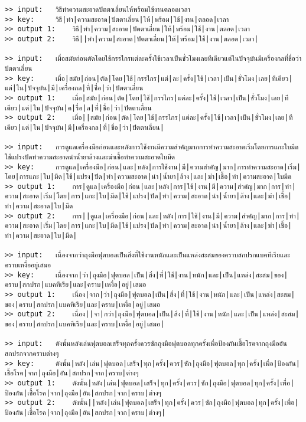 \documentclass[11pt]{article}
\begin{document}
\begin{Verbatim}[commandchars=\\\{\}]
>> input:	วิธีทำความสะอาดปัตตาเลี่ยนให้พร้อมใช้งานตลอดเวลา
>> key:		วิธี|ทำ|ความสะอาด|ปัตตาเลี่ยน|ให้|พร้อม|ใช้|งาน|ตลอด|เวลา
>> output 1:	วิธี|ทำ|ความ|สะอาด|ปัตตาเลี่ยน|ให้|พร้อม|ใช้|งาน|ตลอด|เวลา
>> output 2:	วิธี||ทำ|ความ|สะอาด|ปัตตาเลี่ยน|ให้|พร้อม|ใช้|งาน|ตลอด|เวลา|

>> input:	เมื่อสมัยก่อนตัดโดยใช้กรรไกรแต่ละครั้งใช้เวลาเป็นชั่วโมงเลยทีเดียวแต่ในปัจจุบันมีเครื่องกลที่ชื่อว่าปัตตาเลี่ยน
>> key:		เมื่อ|สมัย|ก่อน|ตัด|โดย|ใช้|กรรไกร|แต่|ละ|ครั้ง|ใช้|เวลา|เป็น|ชั่วโมง|เลย|ทีเดียว|แต่|ใน|ปัจจุบัน|มี|เครื่องกล|ที่|ชื่อ|ว่า|ปัตตาเลี่ยน
>> output 1:	เมื่อ|สมัย|ก่อน|ตัด|โดย|ใช้|กรรไกร|แต่ละ|ครั้ง|ใช้|เวลา|เป็น|ชั่วโมง|เลย|ทีเดียว|แต่|ใน|ปัจจุบัน|ค|รื่อ|ล|ที่|ชื่อ|ว่า|ปัตตาเลี่ยน
>> output 2:	เมื่อ||สมัย|ก่อน|ตัด|โดย|ใช้|กรรไกร|แต่ละ|ครั้ง|ใช้|เวลา|เป็น|ชั่วโมง|เลย|ทีเดียว|แต่|ใน|ปัจจุบัน|มี|เครื่องกล|ที่|ชื่อ|ว่า|ปัตตาเลี่ยน|

>> input:	การดูแลเครื่องมือก่อนและหลังการใช้งานมีความสำคัญมากการทำความสะอาดเริ่มโดยการแกะใบมีดใช้แปรงปัดทำความสะอาดนำน้ำยาล้างและฆ่าเชื้อทำความสะอาดใบมีด
>> key:		การดูแล|เครื่องมือ|ก่อน|และ|หลัง|การใช้งาน|มี|ความสำคัญ|มาก|การทำความสะอาด|เริ่ม|โดย|การแกะ|ใบ|มีด|ใช้|แปรง|ปัด|ทำ|ความสะอาด|นำ|น้ำยา|ล้าง|และ|ฆ่า|เชื้อ|ทำ|ความสะอาด|ใบมีด
>> output 1:	การ|ดูแล|เครื่องมือ|ก่อน|และ|หลัง|การ|ใช้|งาน|มี|ความ|สำคัญ|มาก|การ|ทำ|ความ|สะอาด|เริ่ม|โดย|การ|แกะ|ใบ|มีด|ใช้|แปรง|ปัด|ทำ|ความ|สะอาด|นำ|น้ำยา|ล้าง|และ|ฆ่า|เชื้อ|ทำ|ความ|สะอาด|ใบ|มีด
>> output 2:	การ||ดูแล|เครื่องมือ|ก่อน|และ|หลัง|การ|ใช้|งาน|มี|ความ|สำคัญ|มาก|การ|ทำ|ความ|สะอาด|เริ่ม|โดย|การ|แกะ|ใบ|มีด|ใช้|แปรง|ปัด|ทำ|ความ|สะอาด|นำ|น้ำยา|ล้าง|และ|ฆ่า|เชื้อ|ทำ|ความ|สะอาด|ใบ|มีด|

>> input:	เนื่องจากว่าถุงมือฟุตบอลเป็นสิ่งที่ใช้งานหนักและเป็นแหล่งสะสมของคราบสกปรกแบคทีเรียและคราบเหงื่ออยู่เสมอ
>> key:		เนื่องจาก|ว่า|ถุงมือ|ฟุตบอล|เป็น|สิ่ง|ที่|ใช้|งาน|หนัก|และ|เป็น|แหล่ง|สะสม|ของ|คราบ|สกปรก|แบคทีเรีย|และ|คราบ|เหงื่อ|อยู่|เสมอ
>> output 1:	เนื่อง|จาก|ว่า|ถุงมือ|ฟุตบอล|เป็น|สิ่ง|ที่|ใช้|งาน|หนัก|และ|เป็น|แหล่ง|สะสม|ของ|คราบ|สกปรก|แบคทีเรีย|และ|คราบ|เหงื่อ|อยู่|เสมอ
>> output 2:	เนื่อง||จา|กว่า|ถุงมือ|ฟุตบอล|เป็น|สิ่ง|ที่|ใช้|งาน|หนัก|และ|เป็น|แหล่ง|สะสม|ของ|คราบ|สกปรก|แบคทีเรีย|และ|คราบ|เหงื่อ|อยู่|เสมอ|

>> input:	ดังนั้นหลังเล่นฟุตบอลเสร็จทุกครั้งควรซักถุงมือฟุตบอลทุกครั้งเพื่อป้องกันเชื้อโรคจากถุงมืออันสกปรกจากคราบต่างๆ
>> key:		ดังนั้น|หลัง|เล่น|ฟุตบอล|เสร็จ|ทุก|ครั้ง|ควร|ซัก|ถุงมือ|ฟุตบอล|ทุก|ครั้ง|เพื่อ|ป้องกัน|เชื้อโรค|จาก|ถุงมือ|อัน|สกปรก|จาก|คราบ|ต่างๆ
>> output 1:	ดังนั้น|หลัง|เล่น|ฟุตบอล|เสร็จ|ทุก|ครั้ง|ควร|ซัก|ถุงมือ|ฟุตบอล|ทุก|ครั้ง|เพื่อ|ป้องกัน|เชื้อโรค|จาก|ถุงมือ|อัน|สกปรก|จาก|คราบ|ต่างๆ
>> output 2:	ดังนั้น||หลัง|เล่น|ฟุตบอล|เสร็จ|ทุก|ครั้ง|ควร|ซัก|ถุงมือ|ฟุตบอล|ทุก|ครั้ง|เพื่อ|ป้องกัน|เชื้อโรค|จาก|ถุงมือ|อัน|สกปรก|จาก|คราบ|ต่างๆ|


\end{Verbatim}
\end{document}
